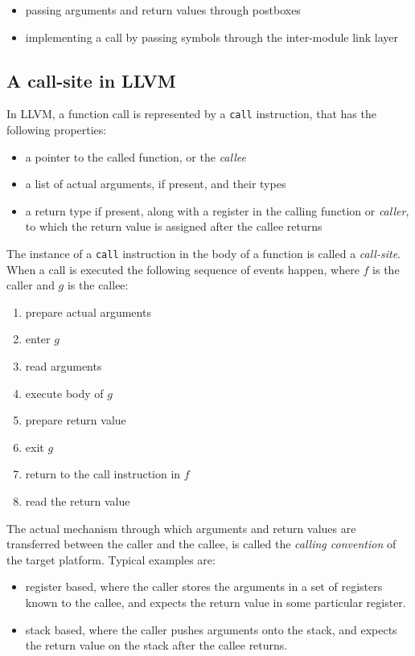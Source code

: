 \documentclass[12pt]{article}
\begin{document}
\begin{itemize}
\item passing arguments and return values through postboxes
\item implementing a call by passing symbols through the inter-module
      link layer
\end{itemize}

\subsection{A call-site in LLVM}
\label{sect:call-site}

In LLVM, a function call is represented by a {\tt call} instruction,
that has the following properties:

\begin{itemize}
\item a pointer to the called function, or the {\it callee}
\item a list of actual arguments, if present, and their types
\item a return type if present, along with a register in
      the calling function or {\it caller}, to which the return value
      is assigned after the callee returns
\end{itemize}

The instance of a {\tt call} instruction in the body of a function is
called a {\it call-site}. When a call is executed the following
sequence of events happen, where $f$ is the caller and $g$ is the
callee:

\begin{enumerate}
\item prepare actual arguments
\item enter $g$
\item read arguments
\item execute body of $g$
\item prepare return value
\item exit $g$
\item return to the call instruction in $f$
\item read the return value
\end{enumerate}

The actual mechanism through which arguments and return values are
transferred between the caller and the callee, is called the {\it
calling convention} of the target platform. Typical examples are:

\begin{itemize}
\item register based, where the caller stores the arguments in a set
      of registers known to the callee, and expects the return value
      in some particular register.
\item stack based, where the caller pushes arguments onto the stack,
      and expects the return value on the stack after the callee
      returns.
\end{itemize}
\end{document}
